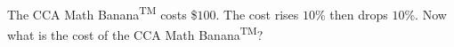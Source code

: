 The CCA Math Banana\textsuperscript{TM} costs \$$100$. The cost rises $10$\% then drops $10$\%. Now what is the cost of the CCA Math Banana\textsuperscript{TM}?